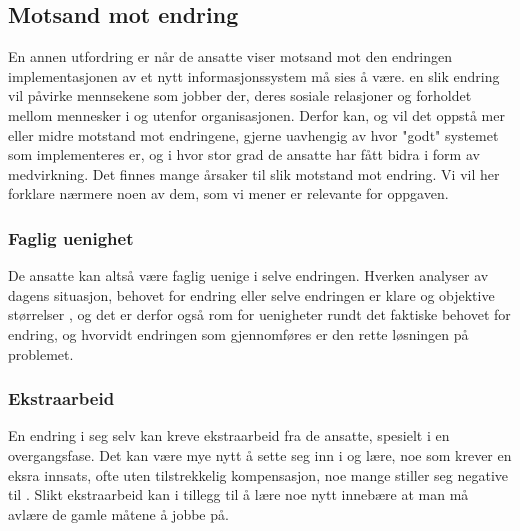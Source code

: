 \subsection{Motsand mot endring}
\label{chp: Motstand}

En annen utfordring er når de ansatte viser motsand mot den endringen implementasjonen av et nytt informasjonssystem må sies å være. en slik endring vil påvirke mennsekene som jobber der, deres sosiale relasjoner og forholdet mellom mennesker i og utenfor organisasjonen. Derfor kan, og vil det oppstå mer eller midre motstand mot endringene, gjerne uavhengig av hvor "godt" systemet som implementeres er, og i hvor stor grad de ansatte har fått bidra i form av medvirkning. Det finnes mange årsaker til slik motstand mot endring. Vi vil her forklare nærmere noen av dem, som vi mener er relevante for oppgaven. 

\subsubsection{Faglig uenighet}
De ansatte kan altså være faglig uenige i selve endringen. Hverken analyser av dagens situasjon, behovet for endring eller selve endringen er klare og objektive størrelser \cite{Jacobsen12}, og det er derfor også rom for uenigheter rundt det faktiske behovet for endring, og hvorvidt endringen som gjennomføres er den rette løsningen på problemet. 

\subsubsection{Ekstraarbeid}
En endring i seg selv kan kreve ekstraarbeid fra de ansatte, spesielt i en overgangsfase. Det kan være mye nytt å sette seg inn i og lære, noe som krever en eksra innsats, ofte uten tilstrekkelig kompensasjon, noe mange stiller seg negative til \cite{Jacobsen12}. Slikt ekstraarbeid kan i tillegg til å lære noe nytt innebære at man må avlære de gamle måtene å jobbe på. 